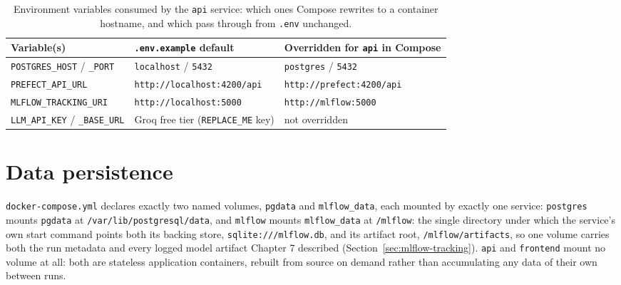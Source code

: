 \begin{table}[H]
\centering
\begin{tabular}{|p{3.4cm}|p{4.9cm}|p{5.2cm}|}
\hline
\textbf{Variable(s)} & \textbf{\texttt{.env.example} default} & \textbf{Overridden for \texttt{api} in Compose} \\
\hline
\texttt{POSTGRES\_HOST} / \texttt{\_PORT} & \texttt{localhost} / \texttt{5432} & \texttt{postgres} / \texttt{5432} \\
\hline
\texttt{PREFECT\_API\_URL} & \texttt{http://\allowbreak localhost:4200/\allowbreak api} & \texttt{http://\allowbreak prefect:4200/\allowbreak api} \\
\hline
\texttt{MLFLOW\_TRACKING\_URI} & \texttt{http://\allowbreak localhost:5000} & \texttt{http://\allowbreak mlflow:5000} \\
\hline
\texttt{LLM\_API\_KEY} / \texttt{\_BASE\_URL} & Groq free tier (\texttt{REPLACE\_ME} key) & not overridden \\
\hline
\end{tabular}
\caption{Environment variables consumed by the \texttt{api} service: which ones Compose rewrites to a container hostname, and which pass through from \texttt{.env} unchanged.}
\label{tab:envvars}
\end{table}

\section{Data persistence}
\label{sec:persistence}
\begin{sloppypar}
\texttt{docker-compose.yml} declares exactly two named volumes, \texttt{pgdata} and \texttt{mlflow\_data}, each mounted by exactly one service: \texttt{postgres} mounts \texttt{pgdata} at \texttt{/var/\allowbreak lib/\allowbreak postgresql/\allowbreak data}, and \texttt{mlflow} mounts \texttt{mlflow\_data} at \texttt{/mlflow}: the single directory under which the service's own start command points both its backing store, \texttt{sqlite:///mlflow.db}, and its artifact root, \texttt{/mlflow/artifacts}, so one volume carries both the run metadata and every logged model artifact Chapter 7 described (Section~\ref{sec:mlflow-tracking}). \texttt{api} and \texttt{frontend} mount no volume at all: both are stateless application containers, rebuilt from source on demand rather than accumulating any data of their own between runs.
\end{sloppypar}

